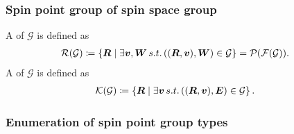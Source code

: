 \subsubsection{Spin point group of spin space group}

A  of $\mathcal{G}$ is defined as
\begin{align}
  \mathcal{R}(\mathcal{G})
    &\coloneqq \left\{  \bm{R}  \mathrel{}\middle|\mathrel{}  \exists \bm{v}, \bm{W} \,s.t.\, ((\bm{R}, \bm{v}), \bm{W}) \in \mathcal{G}  \right\}
    = \mathcal{P}(\mathcal{F}(\mathcal{G})).
\end{align}
A  of $\mathcal{G}$ is defined as
\begin{align}
  \mathcal{K}(\mathcal{G})
    &\coloneqq \left\{  \bm{R}  \mathrel{}\middle|\mathrel{}  \exists \bm{v} \,s.t.\, ((\bm{R}, \bm{v}), \bm{E}) \in \mathcal{G}  \right\}.
\end{align}

\subsubsection{Enumeration of spin point group types}

\todo{}

